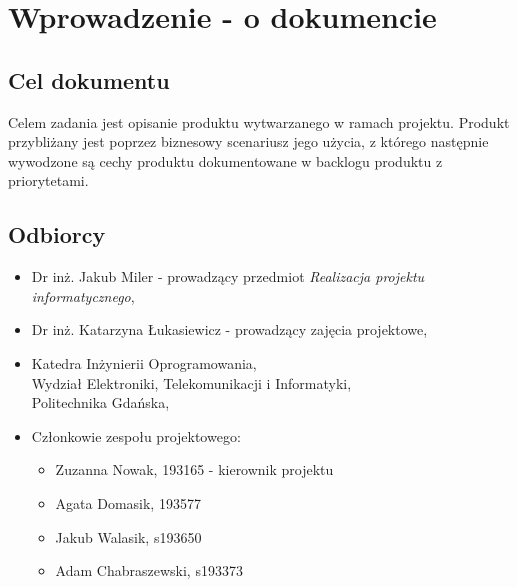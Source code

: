 \documentclass[12pt,a4paper,colorlinks=true,linkcolor=NavyBlue,citecolor=red,urlcolor=NavyBlue]{book}
\begin{document}

\tableofcontents

\chapter{Wprowadzenie - o dokumencie}
\section{Cel dokumentu}
Celem zadania jest opisanie produktu wytwarzanego w ramach projektu. Produkt
przybliżany jest poprzez biznesowy scenariusz jego użycia,
z którego następnie wywodzone są cechy produktu
dokumentowane w backlogu produktu z priorytetami. 
\section{Odbiorcy}

\begin{itemize}
    \item Dr inż. Jakub Miler - prowadzący przedmiot \textit{Realizacja projektu informatycznego},
    \item Dr inż. Katarzyna Łukasiewicz - prowadzący zajęcia projektowe,
    \item Katedra Inżynierii Oprogramowania, \\[2mm] 
Wydział Elektroniki, Telekomunikacji i Informatyki, \\[2mm]  
Politechnika Gdańska,
    \item Członkowie zespołu projektowego:
    \begin{itemize}
        \item[] Zuzanna Nowak, 193165 - kierownik projektu
        \item[] Agata Domasik, 193577
        \item[] Jakub Walasik, s193650
        \item[] Adam Chabraszewski, s193373
    \end{itemize}
\end{itemize}




\end{document}
